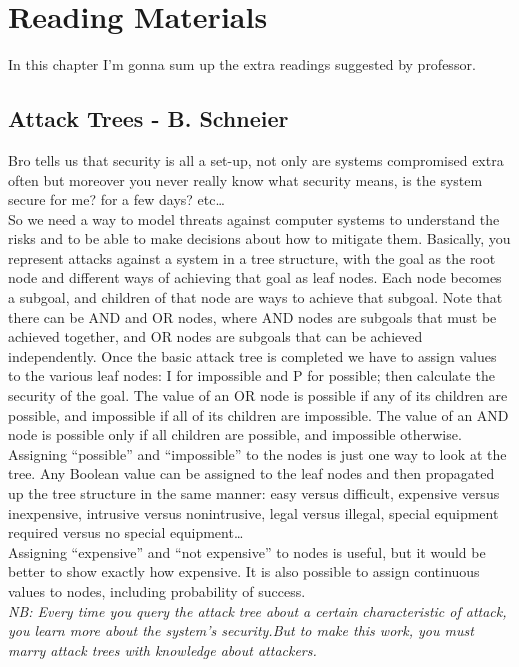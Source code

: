 \chapter{Reading Materials}
In this chapter I'm gonna sum up the extra readings suggested by professor.
\section{Attack Trees - B. Schneier}
Bro tells us that security is all a set-up, not only are systems compromised extra often but moreover you never really know what security means, is the system secure for me? for a few days? etc\dots
\\
So we need a way to model threats against computer systems to understand the risks and to be able to make decisions about how to mitigate them.
Basically, you represent attacks against a system in a tree structure, with the goal as the root node and different ways of achieving that goal as leaf nodes.
Each node becomes a subgoal, and children of that node are ways to achieve that subgoal.
Note that there can be AND and OR nodes, where AND nodes are subgoals that must be achieved together, and OR nodes are subgoals that can be achieved independently.
Once the basic attack tree is completed we have to assign values to the various leaf nodes: I for impossible and P for possible; then calculate the security of the goal. The value of an OR node is
possible if any of its children are possible, and impossible if all of its children are impossible. The value of an AND node is possible only if all children are possible, and impossible otherwise.
\\Assigning “possible” and “impossible” to the nodes is just one way to look at the tree. Any Boolean
value can be assigned to the leaf nodes and then propagated up the tree structure in the same
manner: easy versus difficult, expensive versus inexpensive, intrusive versus nonintrusive, legal versus illegal, special equipment required versus no special equipment\dots
\\Assigning “expensive” and “not expensive” to nodes is useful, but it would be better to show exactly
how expensive. It is also possible to assign continuous values to nodes, including probability of success.
\\\textit{NB: Every time you query the attack tree about a certain characteristic of attack, you learn
more about the system’s security.But to make this work, you must marry attack trees with knowledge about attackers.}
\\
